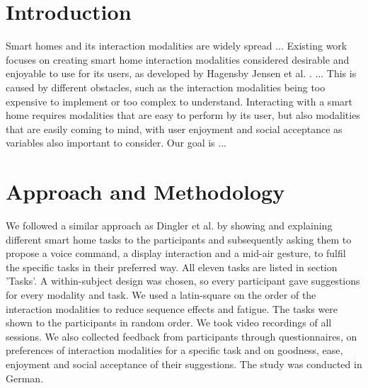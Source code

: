 \documentclass[sigchi]{acmart}
\begin{document}
	
	
	
	
	\maketitle
	
	\section{Introduction}
	Smart homes and its interaction modalities are widely spread ...  Existing work focuses on creating smart home interaction modalities considered desirable and enjoyable to use for its users, as developed by Hagensby Jensen et al. \cite{Jensen.2018}. ... This is caused by different obstacles, such as the interaction modalities being too expensive to implement or too complex to understand. Interacting with a smart home requires modalities that are easy to perform by its user, but also modalities that are easily coming to mind, with user enjoyment and social acceptance as variables also important to consider. Our goal is ... 
	
	\section{Approach and Methodology}
	We followed a similar approach as Dingler et al. \cite{Dingler.2018} by showing and explaining different smart home tasks to the participants and subsequently asking them to propose a voice command, a display interaction and a mid-air gesture, to fulfil the specific tasks in their preferred way. All eleven tasks are listed in section 'Tasks'. A within-subject design was chosen, so every participant gave suggestions for every modality and task. We used a latin-square on the order of the interaction modalities to reduce sequence effects \cite{.2017} and fatigue. The tasks were shown to the participants in  random order. We took video recordings of all sessions. We also collected feedback from participants through questionnaires, on preferences of interaction modalities for a specific task and on goodness, ease, enjoyment and social acceptance of their suggestions. The study was conducted in German.
	
\end{document}
